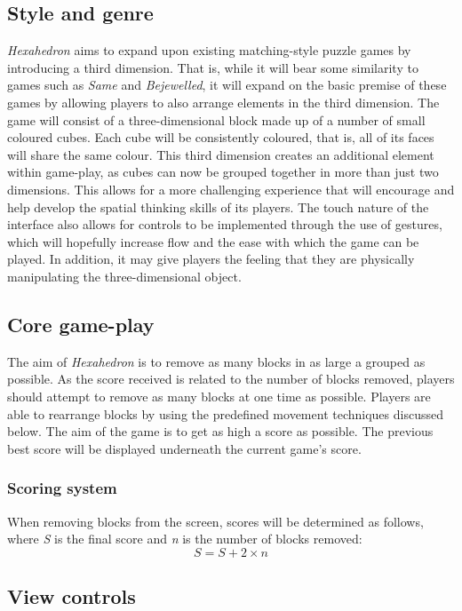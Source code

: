 \subsection{Style and genre}
\emph{Hexahedron} aims to expand upon existing matching-style puzzle games by introducing a third dimension. That is, while it will bear some similarity to games such as \emph{Same} and \emph{Bejewelled}, it will expand on the basic premise of these games by allowing players to also arrange elements in the third dimension. The game will consist of a three-dimensional block made up of a number of small coloured cubes. Each cube will be consistently coloured, that is, all of its faces will share the same colour. This third dimension creates an additional element within game-play, as cubes can now be grouped together in more than just two dimensions. This allows for a more challenging experience that will encourage and help develop the spatial thinking skills of its players. The touch nature of the interface also allows for controls to be implemented through the use of gestures, which will hopefully increase flow and the ease with which the game can be played. In addition, it may give players the feeling that they are physically manipulating the three-dimensional object.


\subsection{Core game-play}
The aim of \emph{Hexahedron} is to remove as many blocks in as large a \gls{grouped} as possible. As the score received is related to the number of blocks removed, players should attempt to remove as many blocks at one time as possible. Players are able to rearrange blocks by using the predefined movement techniques discussed below. The aim of the game is to get as high a score as possible. The previous best score will be displayed underneath the current game's score.


\subsubsection{Scoring system}
When removing blocks from the screen, scores will be determined as follows, where \emph{S} is the final score and \emph{n} is the number of blocks removed:
\[  S = S + 2 \times n \]

\subsection{View controls}
